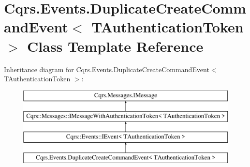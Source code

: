 \hypertarget{classCqrs_1_1Events_1_1DuplicateCreateCommandEvent}{}\section{Cqrs.\+Events.\+Duplicate\+Create\+Command\+Event$<$ T\+Authentication\+Token $>$ Class Template Reference}
\label{classCqrs_1_1Events_1_1DuplicateCreateCommandEvent}
Inheritance diagram for Cqrs.\+Events.\+Duplicate\+Create\+Command\+Event$<$ T\+Authentication\+Token $>$\+:\begin{figure}[H]
\begin{center}
\leavevmode
\includegraphics[height=4.000000cm]{classCqrs_1_1Events_1_1DuplicateCreateCommandEvent}
\end{center}
\end{figure}
